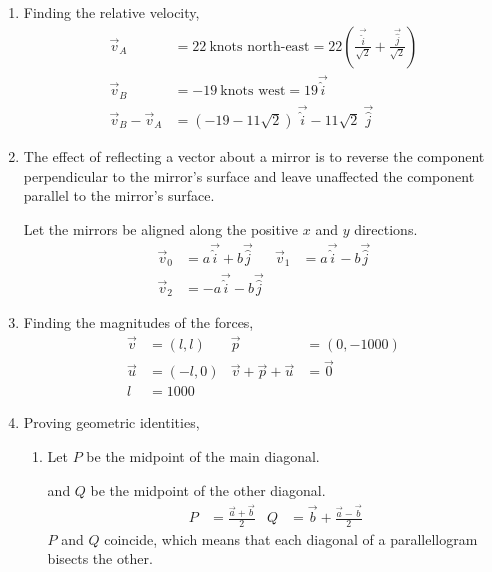 \begin{enumerate}
    \item Finding the relative velocity,
          \begin{align}
              \vec{v}_A             & = 22\ \text{knots north-east} =
              22 \left( \frac{\vec{\hat{i}}}{\sqrt{2}}
              + \frac{\vec{\hat{j}}}{\sqrt{2}} \right)                \\
              \vec{v}_B             & = -19\ \text{knots west} =
              19 \vec{\hat{i}}                                        \\
              \vec{v}_B - \vec{v}_A & =
              (-19 - 11\sqrt{2})\ \vec{\hat{i}} - 11 \sqrt{2}\ \vec{\hat{j}}
          \end{align}

    \item The effect of reflecting a vector about a mirror is to reverse the
          component perpendicular to the mirror's surface and leave unaffected the
          component parallel to the mirror's surface. \par
          Let the mirrors be aligned along the positive $ x $ and $ y $ directions.
          \begin{align}
              \vec{v}_0 & = a \vec{\hat{i}} + b \vec{\hat{j}}  &
              \vec{v}_1 & = a \vec{\hat{i}} - b \vec{\hat{j}}    \\
              \vec{v}_2 & = -a \vec{\hat{i}} - b \vec{\hat{j}}
          \end{align}

    \item Finding the magnitudes of the forces,
          \begin{align}
              \vec{v} & = (l, l)  & \vec{p}                     & = (0, -1000) \\
              \vec{u} & = (-l, 0) & \vec{v} + \vec{p} + \vec{u} & = \vec{0}    \\
              l       & = 1000
          \end{align}

    \item Proving geometric identities,
          \begin{enumerate}
              \item Let $ P $ be the midpoint of the main diagonal. \par
                    and $ Q $ be the midpoint of the other diagonal.
                    \begin{align}
                        P & = \frac{\vec{a} + \vec{b}}{2}           &
                        Q & = \vec{b} + \frac{\vec{a} - \vec{b}}{2}
                    \end{align}
                    $ P $ and $ Q $ coincide, which means that each diagonal of a
                    parallellogram bisects the other.


\end{enumerate}
\end{enumerate}
